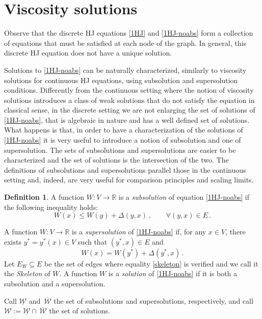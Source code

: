 \documentclass[reqno]{amsart}
\theoremstyle{plain}
\theoremstyle{definition}
\newtheorem{definition}[theorem]{Definition}
\theoremstyle{remark}
\numberwithin{equation}{section}
\numberwithin{theorem}{section}
\newcommand{\upbar}[1]{\,\overline{\! #1}}
\newcommand{\<}{\langle}
\renewcommand{\>}{\rangle}
\begin{document}
\section{Viscosity solutions}

Observe that the discrete HJ equations \eqref{1HJ} and \eqref{1HJ-noabs} form a collection of equations that must be satisfied at each node of the graph. In general, this discrete HJ equation does not have a unique solution.

\smallskip

Solutions to \eqref{1HJ-noabs} can be naturally characterized, similarly to viscosity solutions for continuous HJ equations, using subsolution and supersolution conditions. Differently from the continuous setting where the notion of viscosity solutions introduces a class of weak solutions that do not satisfy the equation in classical sense, in the discrete setting we are not enlarging the set of solutions of \eqref{1HJ-noabs}, that is algebraic in nature and has a well defined set of solutions. What happens is that, in order to have a characterization of the solutions of \eqref{1HJ-noabs} it is very useful to introduce a notion of subsolution and one of supersolution. The sets of subsolutions and supersolutions are easier to be characterized and the set of solutions is the intersection of the two. The definitions of subsolutions and supersolutions parallel those in the continuous setting and, indeed, are very useful for comparison principles and scaling limits.



\begin{definition}\label{def:inout-comp}
	A function $W:V\to\mathbb{R}$ is a \emph{subsolution} of equation \eqref{1HJ-noabs} if the following inequality holds:
	\begin{equation}\label{subsol}
		W(x)\leq W(y)+\Delta(y,x)\,, \qquad \forall(y,x)\in E\,.
	\end{equation} 
	
	
	A function $W:V\to\mathbb{R}$ is a \emph{supersolution} of \eqref{1HJ-noabs} if, for any $x\in V$, there exists $y^*=y^*(x)\in V$ such that $(y^*,x)\in E$ and 
	\begin{equation}\label{skeleton}
		W(x)=W(y^*)+\Delta(y^*,x)\,.
	\end{equation}
	Let $E_W\subseteq E$ be the set of edges where equality \eqref{skeleton} is verified and we call it the \emph{Skeleton} of $W$.
	A function $W$ is a \emph{solution} of \eqref{1HJ-noabs} if it is both a subsolution and a supersolution.
	
	
	Call $\underline {\mathcal W}$ and $\upbar {\mathcal W}$ the set of subsolutions and supersolutions, respectively, and call $\mathcal W:=\underline {\mathcal W}\cap \upbar {\mathcal W}$ the set of solutions.
\end{definition}
\end{document}
